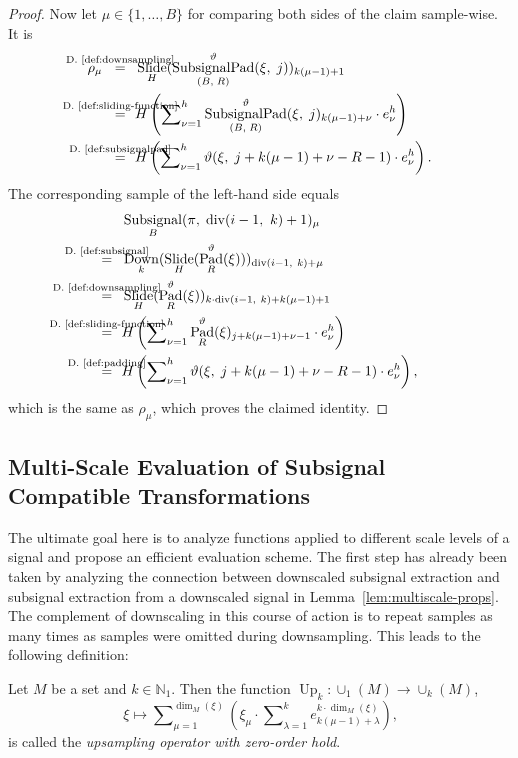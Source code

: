 \documentclass[journal]{IEEEtran}
\newcommand{\N}{\mathbb{N}}
\newcommand{\ROI}{B}
\newcommand{\discint}[2]{\{#1,\dotsc,#2\}}
\newcommand{\inint}[2]{\in\discint{#1}{#2}}
\DeclareMathOperator{\Subsignal}{Subsignal}
\DeclareMathOperator{\Slide}{Slide}
\renewcommand{\div}[2]{\operatorname{div}(#1,\ #2)}
\newcommand{\equsing}[1]{\overset{\mathclap{\text{#1}}}{=}}
\DeclareMathOperator{\Downsampling}{Down}
\DeclareMathOperator{\Upsampling}{Up}
\DeclareMathOperator{\Padding}{Pad}
\newcommand{\PaddingParams}{\Padding_R^\vartheta}
\DeclareMathOperator{\SubsignalPad}{SubsignalPad}
\newcommand{\SubsignalPadROIParams}{\SubsignalPad_{(\ROI,\; R)}^{\vartheta}}
\begin{document}
\begin{proof}
Now let $\mu\inint{1}{\ROI}$ for comparing both sides of the claim sample-wise.
It is
\begin{align*}
  \rho_\mu\ \;\equsing{D.~\ref{def:downsampling}}\ \ &\Slide_H(\SubsignalPadROIParams(\xi,\;j))_{k(\mu - 1) + 1}\\
  \equsing{D.~\ref{def:sliding-function}}\ \ &H\left(\sum\nolimits_{\nu = 1}^h \SubsignalPadROIParams(\xi,\;j)_{k(\mu - 1) + \nu}\cdot e_\nu^h \right)\\
  \equsing{D.~\ref{def:subsignalpad}}\ \ &H\left(\sum\nolimits_{\nu = 1}^h \vartheta(\xi,\;j + k(\mu - 1) + \nu - R - 1)\cdot e_\nu^h \right)\text{.}
\end{align*}
The corresponding sample of the left-hand side equals
\begin{align*}
  &\Subsignal_\ROI(\pi,\;\div{i - 1}{k} + 1)_\mu\\
  \equsing{D.~\ref{def:subsignal}}\ \ &\Downsampling_k(\Slide_H(\PaddingParams(\xi)))_{\div{i - 1}{k} + \mu}\\
  \equsing{D.~\ref{def:downsampling}}\ \ &\Slide_H(\PaddingParams(\xi))_{k\cdot\div{i - 1}{k} + k(\mu - 1) + 1}\\
  \equsing{D.~\ref{def:sliding-function}}\ \ &H\left( \sum\nolimits_{\nu = 1}^h \PaddingParams(\xi)_{j + k(\mu - 1) + \nu - 1}\cdot e_\nu^h \right)\\
  \equsing{D.~\ref{def:padding}}\ \ &H\left( \sum\nolimits_{\nu = 1}^h \vartheta(\xi,\;j + k(\mu - 1) + \nu - R - 1)\cdot e_\nu^h \right)\text{,}
\end{align*}
which is the same as $\rho_\mu$, which proves the claimed identity.
\end{proof}\subsection{Multi-Scale Evaluation of Subsignal Compatible Transformations}
The ultimate goal here is to analyze functions applied to different scale levels of a signal and propose an efficient evaluation scheme.
The first step has already been taken by analyzing the connection between downscaled subsignal extraction and subsignal extraction from a downscaled signal in Lemma~\ref{lem:multiscale-props}.
The complement of downscaling in this course of action is to repeat samples as many times as samples were omitted during downsampling.
This leads to the following definition:

\begin{definition}
\label{def:upsampling}
Let $M$ be a set and $k\in\N_1$.
Then the function $\Upsampling_k\colon\cup_1(M)\to\cup_k(M)$,
\begin{displaymath}
  \xi\mapsto\sum\nolimits_{\mu = 1}^{\dim_M(\xi)}\left(\xi_\mu\cdot \sum\nolimits_{\lambda = 1}^k e_{k (\mu - 1) + \lambda}^{k\cdot\dim_M(\xi)} \right)\text{,}
\end{displaymath}
is called the \emph{upsampling operator with zero-order hold}.
\end{definition}
\end{document}
